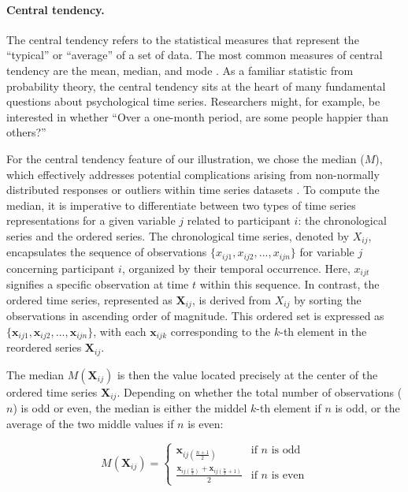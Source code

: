 \paragraph{Central tendency.}

The central tendency refers to the statistical measures that represent
the ``typical'' or ``average'' of a set of data. The most common
measures of central tendency are the mean, median, and mode
\citep{weisberg1992}. As a familiar statistic from probability theory,
the central tendency sits at the heart of many fundamental questions
about psychological time series. Researchers might, for example, be
interested in whether ``Over a one-month period, are some people happier
than others?''

For the central tendency feature of our illustration, we chose the
median (\(M\)), which effectively addresses potential complications
arising from non-normally distributed responses or outliers within time
series datasets \citep{weisberg1992}. To compute the median, it is
imperative to differentiate between two types of time series
representations for a given variable \(j\) related to participant \(i\):
the chronological series and the ordered series. The chronological time
series, denoted by \(X_{ij}\), encapsulates the sequence of observations
\(\{x_{ij1}, x_{ij2}, ..., x_{ijn}\}\) for variable \(j\) concerning
participant \(i\), organized by their temporal occurrence. Here,
\(x_{ijt}\) signifies a specific observation at time \(t\) within this
sequence. In contrast, the ordered time series, represented as
\(\mathbf{X}_{ij}\), is derived from \(X_{ij}\) by sorting the
observations in ascending order of magnitude. This ordered set is
expressed as
\(\{\mathbf{x}_{ij1}, \mathbf{x}_{ij2}, ..., \mathbf{x}_{ijn}\}\), with
each \(\mathbf{x}_{ijk}\) corresponding to the \(k\)-th element in the
reordered series \(\mathbf{X}_{ij}\).

The median \(M(\mathbf{X}_{ij})\) is then the value located precisely at
the center of the ordered time series \(\mathbf{X}_{ij}\). Depending on
whether the total number of observations (\(n\)) is odd or even, the
median is either the middel \(k\)-th element if \(n\) is odd, or the
average of the two middle values if \(n\) is even:

\begin{equation} \label{eq:median}
  M(\mathbf{X}_{ij}) = 
  \begin{cases}
    \mathbf{x}_{ij\left(\frac{n+1}{2}\right)} & \text{if $n$ is odd} \\
    \frac{\mathbf{x}_{ij\left(\frac{n}{2}\right)} + \mathbf{x}_{ij\left(\frac{n}{2} + 1\right)}}{2} & \text{if $n$ is even}
  \end{cases}
\end{equation}

